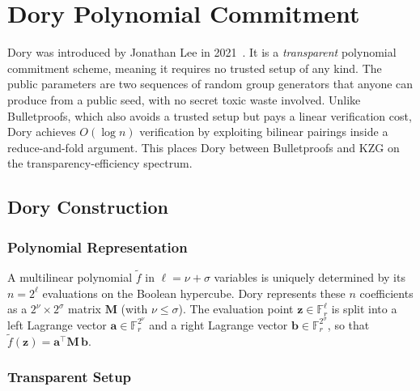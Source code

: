 
\chapter{Dory Polynomial Commitment}
\label{chap:dory}

Dory was introduced by Jonathan Lee in 2021~\cite{lee2021dory}. It is a
\emph{transparent} polynomial commitment scheme, meaning it requires no
trusted setup of any kind. The public parameters are two sequences of random
group generators that anyone can produce from a public seed, with no secret
toxic waste involved. Unlike Bulletproofs, which also avoids a trusted setup
but pays a linear verification cost, Dory achieves $O(\log n)$ verification by
exploiting bilinear pairings inside a reduce-and-fold argument. This places
Dory between Bulletproofs and KZG on the transparency-efficiency spectrum.

\section{Dory Construction}

\subsection{Polynomial Representation}

A multilinear polynomial $\tilde{f}$ in $\ell = \nu + \sigma$ variables is
uniquely determined by its $n = 2^\ell$ evaluations on the Boolean hypercube.
Dory represents these $n$ coefficients as a $2^\nu \times 2^\sigma$ matrix
$\mathbf{M}$ (with $\nu \leq \sigma$). The evaluation point
$\mathbf{z} \in \mathbb{F}_r^\ell$ is split into a left Lagrange vector
$\mathbf{a} \in \mathbb{F}_r^{2^\nu}$ and a right Lagrange vector
$\mathbf{b} \in \mathbb{F}_r^{2^\sigma}$, so that
$\tilde{f}(\mathbf{z}) = \mathbf{a}^\top \mathbf{M}\, \mathbf{b}$.

\subsection{Transparent Setup}

